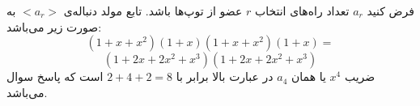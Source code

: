 \p
فرض کنید
$a_r$
تعداد راه‌های انتخاب 
$r$
عضو از توپ‌ها باشد. تابع مولد دنباله‌ی 
$< a_r >$
به صورت زیر می‌باشد: 
$$(1 + x + x^2)(1 + x)(1 + x + x^2)(1 + x) = $$
$$(1 + 2x + 2x^2 + x^3)(1 + 2x + 2x^2 + x^3)$$
ضریب 
$x^4$
یا همان 
$a_4$
در عبارت بالا برابر با 
$2 + 4 + 2 = 8$
است که پاسخ سوال می‌باشد.
